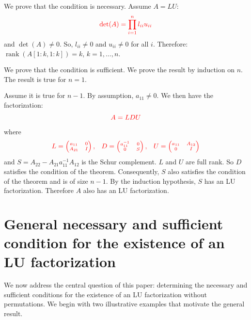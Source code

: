 \documentclass[10pt,twoside]{siamart1116}
\DeclareMathOperator{\rk}{rank}
\numberwithin{theorem}{section}
\providecommand{\DIFdel}[1]{{\protect\color{red} \scriptsize #1}} %
\providecommand{\DIFdelbegin}{} %
\providecommand{\DIFdelend}{} %
\begin{document}
\DIFdel{We prove that the condition is necessary. Assume $A = LU$:
	}\[ \DIFdel{\det(A) = \prod_{i=1}^n l_{ii} u_{ii} }\]%
\DIFdel{and $\det(A) \neq 0$. So, $l_{ii} \neq 0$ and $u_{ii} \neq 0$ for all $i$. Therefore: $\rk(A[1:k,1:k]) = k$, $k = 1, \ldots, n$.
}%

\DIFdel{We prove that the condition is sufficient. We prove the result by induction on $n$. The result is true for $n=1$.
}%

\DIFdel{Assume it is true for $n-1$. By assumption, $a_{11} \neq 0$. We then have the factorization:
	}\[
		\DIFdel{A = LDU
	}\]%
\DIFdel{where
	}\[
		\DIFdel{L = \begin{pmatrix}
			a_{11} & 0 \\
			A_{21} & I
		\end{pmatrix}, \quad
		D = \begin{pmatrix}
			a_{11}^{-1} & 0 \\
			0           & S
		\end{pmatrix}, \quad
		U = \begin{pmatrix}
			a_{11} & A_{12} \\
			0      & I
		\end{pmatrix}
	}\]%
\DIFdel{and $S = A_{22} - A_{21} a_{11}^{-1} A_{12}$ is the Schur complement. $L$ and $U$ are full rank. So $D$ satisfies the condition of the theorem. Consequently, $S$ also satisfies the condition of the theorem and is of size $n-1$. By the induction hypothesis, $S$ has an LU factorization. Therefore $A$ also has an LU factorization.
}%

\DIFdelend \section{General necessary and sufficient condition for the existence of an LU factorization}\label{sec:main}

We \DIFdelbegin \DIFdel{now }\DIFdelend address the central question of this paper: determining the necessary and sufficient conditions for the existence of an LU factorization without permutations. We begin with two illustrative examples that motivate the general result.
\end{document}
